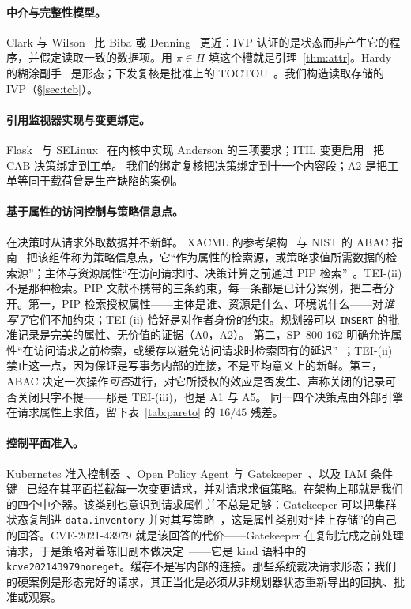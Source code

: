 \documentclass[acmsmall,manuscript,review,anonymous]{acmart}
\renewcommand{\_}{\discretionary{\textunderscore}{}{\textunderscore}}
\begin{document}
\paragraph{中介与完整性模型。}
Clark 与 Wilson~\cite{clark1987comparison} 比 Biba 或 Denning~\cite{biba1977integrity,denning1976lattice} 更近：{IVP} 认证的是状态而非产生它的程序，并假定读取一致的数据项。用 $\pi\in\Pi$ 填这个槽就是引理~\ref{thm:attr}。Hardy 的糊涂副手~\cite{hardy1988confused} 是形态；下发复核是批准上的 TOCTOU~\cite{bishop1996tocttou}。我们构造读取存储的 {IVP}（\S\ref{sec:tcb}）。

\paragraph{引用监视器实现与变更绑定。}
Flask~\cite{spencer1999flask} 与 SELinux~\cite{loscocco2001integrating} 在内核中实现 Anderson 的三项要求；ITIL 变更启用~\cite{axelos2019itil} 把 CAB 决策绑定到工单。
我们的绑定复核把决策绑定到十一个内容段；A2 是把工单等同于载荷曾是生产缺陷的案例。

\paragraph{基于属性的访问控制与策略信息点。}
在决策时从请求外取数据并不新鲜。
{XACML} 的参考架构~\cite{oasis2013xacml} 与 {NIST} 的 {ABAC} 指南~\cite{hu2014abac} 把该组件称为策略信息点，它“作为属性的检索源，或策略求值所需数据的检索源”；主体与资源属性“在访问请求时、决策计算之前通过 {PIP} 检索”~\cite{ferraiolo2016abacstandards}。{TEI}-(ii) 不是那种检索。{PIP} 文献不携带的三条约束，每一条都是已计分案例，把二者分开。第一，{PIP} 检索授权属性——主体是谁、资源是什么、环境说什么——对\emph{谁写了}它们不加约束；{TEI}-(ii) 恰好是对作者身份的约束。规划器可以 \texttt{INSERT} 的批准记录是完美的属性、无价值的证据（{A0}，{A2}）。
第二，{SP}~800-162 明确允许属性“在访问请求之前检索，或缓存以避免访问请求时检索固有的延迟”~\cite{hu2014abac}；{TEI}-(ii) 禁止这一点，因为保证是写事务内部的连接，不是平均意义上的新鲜。第三，{ABAC} 决定一次操作\emph{可否}进行，对它所授权的效应是否发生、声称关闭的记录可否关闭只字不提——那是 {TEI}-(iii)，也是 {A1} 与 {A5}。
同一四个决策点由外部引擎在请求属性上求值，留下表~\ref{tab:pareto} 的 $16/45$ 残差。

\paragraph{控制平面准入。}
Kubernetes 准入控制器~\cite{k8s-admission}、Open Policy Agent 与 Gatekeeper~\cite{opa,gatekeeper}、以及 IAM 条件键~\cite{aws-iam-conditions}
已经在其平面拦截每一次变更请求，并对请求求值策略。在架构上那就是我们的四个中介器。该类别也意识到请求属性并不总是足够：Gatekeeper 可以把集群状态复制进 \texttt{data.inventory} 并对其写策略~\cite{gatekeeper-replication}，这是属性类别对“挂上存储”的自己的回答。CVE-2021-43979 就是该回答的代价——Gatekeeper 在复制完成之前处理请求，于是策略对着陈旧副本做决定~\cite{cve202143979}——它是 kind 语料中的
\texttt{k\_cve\_2021\_43979\_no\_reget}。缓存不是写内部的连接。那些系统裁决请求形态；我们的硬案例是形态完好的请求，其正当化是必须从非规划器状态重新导出的回执、批准或观察。
\end{document}
